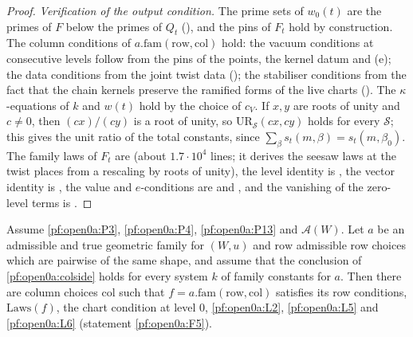 \begin{proof}
\emph{Verification of the output condition.} The prime sets of $w_0(t)$ are the primes of $F$ below the primes of $Q_t$
(), and the pins of $F_t$ hold by construction. The column
conditions of $a.\mathrm{fam}(\mathrm{row},\mathrm{col})$ hold: the vacuum conditions at consecutive levels follow from the
pins of the points, the kernel datum and (e); the data conditions from the joint twist data
(); the stabiliser conditions from the fact that the chain
kernels preserve the ramified forms of the live charts
(). The $\kappa$-equations of $k$ and $w(t)$ hold
by the choice of $c_V$. If $x,y$ are roots of unity and $c\ne0$, then $(cx)/(cy)$ is a root of unity, so
$\mathrm{UR}_{\mathcal S}(cx,cy)$ holds for every $\mathcal S$; this gives the unit ratio of the total constants, since
$\sum_\beta s_t(m,\beta)=s_t(m,\beta_0)$. The family laws of $F_t$ are 
(about $1.7\cdot10^4$ lines; it derives the seesaw laws at the twist places from a rescaling by roots of unity), the level
identity is , the vector identity is
, the value and $e$-conditions are
 and
, and the vanishing of the zero-level terms is
.
\end{proof}

\begin{proposition}\label{pf:open0a:lawslinks}
Assume \ref{pf:open0a:P3}, \ref{pf:open0a:P4}, \ref{pf:open0a:P13} and $\mathcal A(W)$. Let $a$ be an admissible and true
geometric family for $(W,u)$ and $\mathrm{row}$ admissible row choices which are pairwise of the same shape, and assume
that the conclusion of \cref{pf:open0a:colside} holds for every system $k$ of family constants for $a$. Then there are
column choices $\mathrm{col}$ such that $f=a.\mathrm{fam}(\mathrm{row},\mathrm{col})$ satisfies its row conditions,
$\mathrm{Laws}(f)$, the chart condition at level $0$, \ref{pf:open0a:L2}, \ref{pf:open0a:L5} and \ref{pf:open0a:L6}
(statement \ref{pf:open0a:F5}).
\end{proposition}

